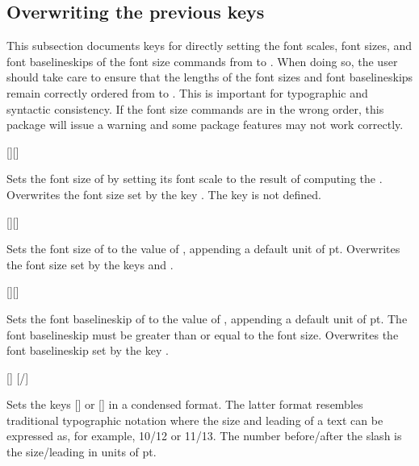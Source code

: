 \documentclass{beery}
\begin{document}
\subsection{Overwriting the previous keys}
\label{subsec:overwriting}

This subsection documents keys for directly setting the font scales, font sizes, and font baselineskips of the font size commands from  to .
When doing so, the user should take care to ensure that the lengths of the font sizes and font baselineskips remain correctly ordered from  to .
This is important for typographic and syntactic consistency.
If the font size commands are in the wrong order, this package will issue a warning and some package features may not work correctly.

[][]
\KeepNextPar*

Sets the font size of  by setting its font scale to the result of computing the .
Overwrites the font size set by the key .
The key  is not defined.

[][]
\KeepNextPar*

Sets the font size of  to the value of , appending a default unit of \unit{pt}.
Overwrites the font size set by the keys  and .

[][]
\KeepNextPar*

Sets the font baselineskip of  to the value of , appending a default unit of \unit{pt}.
The font baselineskip must be greater than or equal to the font size.
Overwrites the font baselineskip set by the key .

[]
\nopagebreak\newline
{}[/]

Sets the keys [] or [] in a condensed format.
The latter format resembles traditional typographic notation where the size and leading of a text can be expressed as, for example, \num{10}/\num{12} or \num{11}/\num{13}.
The number before\slash{}after the slash is the size\slash{}leading in units of \unit{pt}.
\end{document}
